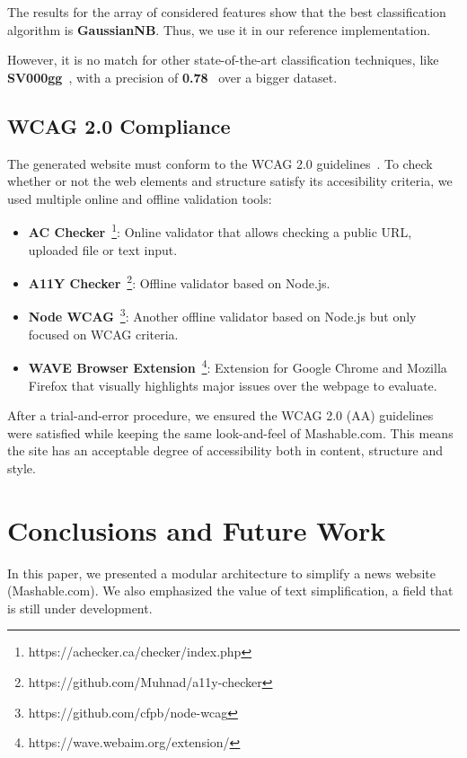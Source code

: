 \documentclass[11pt,a4paper]{article}
\begin{document}
The results for the array of considered features show that the best classification algorithm is \textbf{GaussianNB}. Thus, we use it in our reference implementation.

However, it is no match for other state-of-the-art classification techniques, like \textbf{SV000gg}~\cite{paetzold2016sv000gg}, with a precision of \textbf{0.78}~\cite{paetzold2016semeval} over a bigger dataset.

\subsection{WCAG 2.0 Compliance}

The generated website must conform to the WCAG 2.0 guidelines~\cite{caldwell2008web}. To check whether or not the web elements and structure satisfy its accesibility criteria, we used multiple online and offline validation tools:

\begin{itemize}
	\item{\textbf{AC Checker}~\footnote{https://achecker.ca/checker/index.php}: Online validator that allows checking a public URL, uploaded file or text input.}
	\item{\textbf{A11Y Checker}~\footnote{https://github.com/Muhnad/a11y-checker}: Offline validator based on Node.js.}
	\item{\textbf{Node WCAG}~\footnote{https://github.com/cfpb/node-wcag}: Another offline validator based on Node.js but only focused on WCAG criteria.}
	\item{\textbf{WAVE Browser Extension}~\footnote{https://wave.webaim.org/extension/}: Extension for Google Chrome and Mozilla Firefox that visually highlights major issues over the webpage to evaluate.}
\end{itemize}

After a trial-and-error procedure, we ensured the WCAG 2.0 (AA) guidelines were satisfied while keeping the same look-and-feel of Mashable.com. This means the site has an acceptable degree of accessibility both in content, structure and style.

\section{Conclusions and Future Work}

In this paper, we presented a modular architecture to simplify a news website (Mashable.com). We also emphasized the value of text simplification, a field that is still under development.
\end{document}
